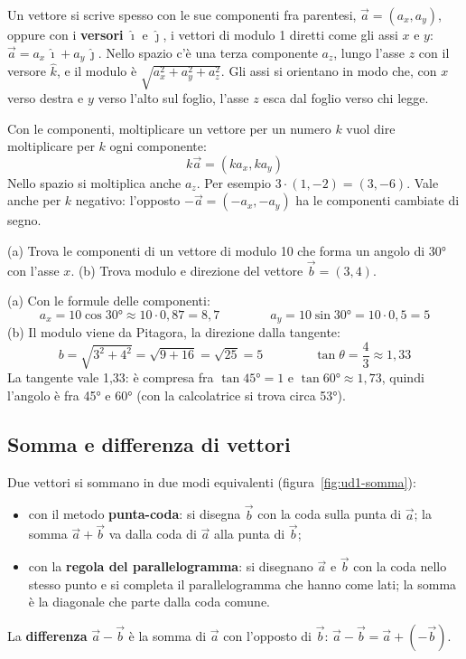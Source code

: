 Un vettore si scrive spesso con le sue componenti fra parentesi, $\vec a = (a_x, a_y)$, oppure con i \textbf{versori} $\hat\imath$ e $\hat\jmath$, i vettori di modulo 1 diretti come gli assi $x$ e $y$: $\vec a = a_x\,\hat\imath + a_y\,\hat\jmath$. Nello spazio c'è una terza componente $a_z$, lungo l'asse $z$ con il versore $\hat k$, e il modulo è $\sqrt{a_x^{2} + a_y^{2} + a_z^{2}}$. Gli assi si orientano in modo che, con $x$ verso destra e $y$ verso l'alto sul foglio, l'asse $z$ esca dal foglio verso chi legge.

Con le componenti, moltiplicare un vettore per un numero $k$ vuol dire moltiplicare per $k$ ogni componente:
\[
  k\vec a = (k a_x, k a_y)
\]
Nello spazio si moltiplica anche $a_z$. Per esempio $3 \cdot (1, -2) = (3, -6)$. Vale anche per $k$ negativo: l'opposto $-\vec a = (-a_x, -a_y)$ ha le componenti cambiate di segno.

\begin{esempio}
(a) Trova le componenti di un vettore di modulo 10 che forma un angolo di \ang{30} con l'asse $x$. (b) Trova modulo e direzione del vettore $\vec b = (3, 4)$.

(a) Con le formule delle componenti:
\[
  a_x = 10 \cos\ang{30} \approx 10 \cdot 0{,}87 = 8{,}7
  \qquad\qquad
  a_y = 10 \sin\ang{30} = 10 \cdot 0{,}5 = 5
\]
(b) Il modulo viene da Pitagora, la direzione dalla tangente:
\[
  b = \sqrt{3^{2} + 4^{2}} = \sqrt{9 + 16} = \sqrt{25} = 5
  \qquad\qquad
  \tan\theta = \frac{4}{3} \approx 1{,}33
\]
La tangente vale 1,33: è compresa fra $\tan\ang{45} = 1$ e $\tan\ang{60} \approx 1{,}73$, quindi l'angolo è fra \ang{45} e \ang{60} (con la calcolatrice si trova circa \ang{53}).
\end{esempio}

\subsection{Somma e differenza di vettori}

Due vettori si sommano in due modi equivalenti (figura~\ref{fig:ud1-somma}):
\begin{itemize}
  \item con il metodo \textbf{punta-coda}: si disegna $\vec b$ con la coda sulla punta di $\vec a$; la somma $\vec a + \vec b$ va dalla coda di $\vec a$ alla punta di $\vec b$;
  \item con la \textbf{regola del parallelogramma}: si disegnano $\vec a$ e $\vec b$ con la coda nello stesso punto e si completa il parallelogramma che hanno come lati; la somma è la diagonale che parte dalla coda comune.
\end{itemize}
La \textbf{differenza} $\vec a - \vec b$ è la somma di $\vec a$ con l'opposto di $\vec b$: $\vec a - \vec b = \vec a + (-\vec b)$.

